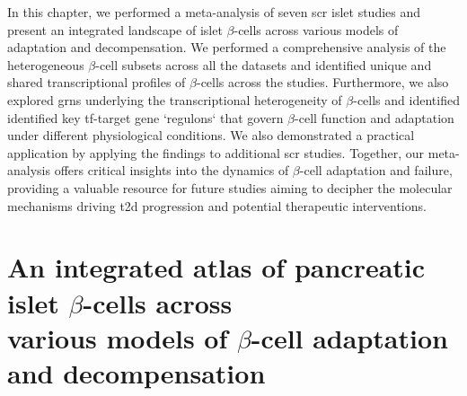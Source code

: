 \par In this chapter, we performed a meta-analysis of seven \gls{scr} islet studies and present an integrated landscape of islet $\beta$-cells across various models of adaptation and decompensation. We performed a comprehensive analysis of the heterogeneous $\beta$-cell subsets across all the datasets and identified unique and shared transcriptional profiles of $\beta$-cells across the studies. Furthermore, we also explored \glspl{grn} underlying the transcriptional heterogeneity of $\beta$-cells and identified identified key \gls{tf}-target gene `regulons` that govern $\beta$-cell function and adaptation under different physiological conditions. We also demonstrated a practical application by applying the findings to additional \gls{scr} studies. Together, our meta-analysis offers critical insights into the dynamics of $\beta$-cell adaptation and failure, providing a valuable resource for future studies aiming to decipher the molecular mechanisms driving \gls{t2d} progression and potential therapeutic interventions.



\section[An integrated atlas of pancreatic islet $\beta$-cells across various models of $\beta$-cell adaptation and decompensation]{An integrated atlas of pancreatic islet $\beta$-cells across\\various models of $\beta$-cell adaptation and decompensation}
\label{sec:int_atlas}

